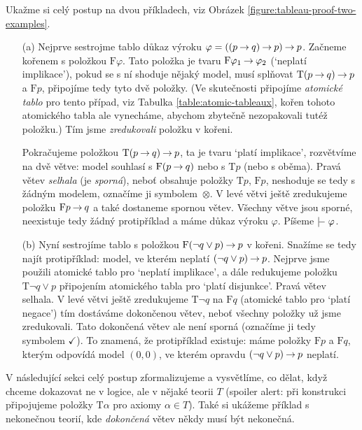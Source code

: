 \begin{example}\label{example:tableau-intro-examples}
Ukažme si celý postup na dvou příkladech, viz Obrázek \ref{figure:tableau-proof-two-examples}.
\begin{itemize}
    \item[(a)] Nejprve sestrojme tablo důkaz výroku $\varphi=((p\mathbin{\rightarrow} q)\mathbin{\rightarrow} p)\mathbin{\rightarrow} p$. Začneme kořenem s položkou $\mathrm{F}\varphi$. Tato položka je tvaru $\mathrm{F}\varphi_1\mathbin{\rightarrow}\varphi_2$ (`neplatí implikace'), pokud se s ní shoduje nějaký model, musí splňovat $\mathrm{T}(p\mathbin{\rightarrow} q)\mathbin{\rightarrow} p$ a $\mathrm{F}p$, připojíme tedy tyto dvě položky. (Ve skutečnosti připojíme \emph{atomické tablo} pro tento případ, viz Tabulka \ref{table:atomic-tableaux}, kořen tohoto atomického tabla ale vynecháme, abychom zbytečně nezopakovali tutéž položku.) Tím jsme \emph{zredukovali} položku v kořeni.

    Pokračujeme položkou $\mathrm{T}(p\mathbin{\rightarrow} q)\mathbin{\rightarrow} p$, ta je tvaru `platí implikace', rozvětvíme na dvě větve: model souhlasí s $\mathrm{F}(p\mathbin{\rightarrow} q)$ nebo s $\mathrm{T}p$ (nebo s oběma). Pravá větev \emph{selhala} (je \emph{sporná}), neboť obsahuje položky $\mathrm{T}p$, $\mathrm{F}p$, neshoduje se tedy s žádným modelem, označíme ji symbolem~$\otimes$. V levé větvi ještě zredukujeme položku $\mathrm{F}p\mathbin{\rightarrow} q$ a také dostaneme spornou větev. Všechny větve jsou sporné, neexistuje tedy žádný protipříklad a máme důkaz výroku $\varphi$. Píšeme $\proves\varphi$.

    \item[(b)] Nyní sestrojíme tablo s položkou $\mathrm{F}(\neg q\lor p)\mathbin{\rightarrow} p$ v kořeni. Snažíme se tedy najít protipříklad: model, ve kterém neplatí $(\neg q\lor p)\mathbin{\rightarrow} p$. Nejprve jsme použili atomické tablo pro `neplatí implikace', a dále redukujeme položku $\mathrm{T}\neg q\lor p$ připojením atomického tabla pro `platí disjunkce'. Pravá větev selhala. V levé větvi ještě zredukujeme $\mathrm{T}\neg q$ na $\mathrm{F}q$ (atomické tablo pro `platí negace') tím dostáváme dokončenou větev, neboť všechny položky už jsme zredukovali. Tato dokončená větev ale není sporná (označíme ji tedy symbolem $\checkmark$). To znamená, že protipříklad existuje: máme položky $\mathrm{F}p$ a $\mathrm{F}q$, kterým odpovídá model $(0,0)$, ve kterém opravdu $(\neg q\lor p)\mathbin{\rightarrow} p$ neplatí.

\end{itemize}

V následující sekci celý postup zformalizujeme a vysvětlíme, co dělat, když chceme dokazovat ne v logice, ale v nějaké teorii $T$ (spoiler alert: při konstrukci připojujeme položky $\mathrm{T}\alpha$ pro axiomy $\alpha\in T$). Také si ukážeme příklad s nekonečnou teorií, kde \emph{dokončená} větev někdy musí být nekonečná.


\end{example}
